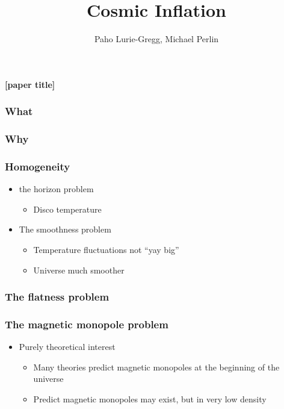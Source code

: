 \documentclass[]{beamer}
\title{Cosmic Inflation}
\author{Paho Lurie-Gregg, Michael Perlin}
\date{}
\renewcommand{\red}[1]{{\bf \color{red} #1}}
\newcommand{\fixme}[1]{\red{[#1]}}
\begin{document}
\begin{frame}
  \maketitle
  \begin{center}
    \fixme{paper title}
    \vspace{1.5in}
  \end{center}

\end{frame}


\begin{frame}
  \frametitle{What}
  
\end{frame}

\begin{frame}
  \frametitle{Why}
  
\end{frame}

\begin{frame}
  \frametitle{Homogeneity}
  \begin{itemize}
  \item the horizon problem
    \begin{itemize}
    \item Disco temperature
    \end{itemize}

  \item The smoothness problem
    \begin{itemize}
    \item Temperature fluctuations not ``yay big''
    \item Universe much smoother
    \end{itemize}

  \end{itemize}

\end{frame}


\begin{frame}
  \frametitle{The flatness problem}

\end{frame}

\begin{frame}
  \frametitle{The magnetic monopole problem}
  \begin{itemize}
  \item Purely theoretical interest
    \begin{itemize}
    \item Many theories predict magnetic monopoles at the beginning of the
      universe
      \item Predict magnetic monopoles may exist, but in very low density
    \end{itemize}

  \end{itemize}
\end{frame}
\end{document}
